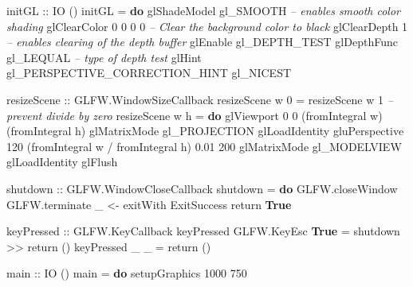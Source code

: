 \documentclass[]{article}
\newenvironment{Shaded}{}{}
\newcommand{\KeywordTok}[1]{\textcolor[rgb]{0.00,0.44,0.13}{\textbf{{#1}}}}
\newcommand{\DataTypeTok}[1]{\textcolor[rgb]{0.56,0.13,0.00}{{#1}}}
\newcommand{\DecValTok}[1]{\textcolor[rgb]{0.25,0.63,0.44}{{#1}}}
\newcommand{\FloatTok}[1]{\textcolor[rgb]{0.25,0.63,0.44}{{#1}}}
\newcommand{\CommentTok}[1]{\textcolor[rgb]{0.38,0.63,0.69}{\textit{{#1}}}}
\newcommand{\OtherTok}[1]{\textcolor[rgb]{0.00,0.44,0.13}{{#1}}}
\newcommand{\FunctionTok}[1]{\textcolor[rgb]{0.02,0.16,0.49}{{#1}}}
\newcommand{\NormalTok}[1]{{#1}}
\begin{document}
\begin{Shaded}
\begin{Highlighting}[]
\OtherTok{initGL ::} \DataTypeTok{IO} \NormalTok{()}
\NormalTok{initGL }\FunctionTok{=} \KeywordTok{do}
  \NormalTok{glShadeModel gl_SMOOTH }\CommentTok{-- enables smooth color shading}
  \NormalTok{glClearColor }\DecValTok{0} \DecValTok{0} \DecValTok{0} \DecValTok{0} \CommentTok{-- Clear the background color to black}
  \NormalTok{glClearDepth }\DecValTok{1} \CommentTok{-- enables clearing of the depth buffer}
  \NormalTok{glEnable gl_DEPTH_TEST}
  \NormalTok{glDepthFunc gl_LEQUAL  }\CommentTok{-- type of depth test}
  \NormalTok{glHint gl_PERSPECTIVE_CORRECTION_HINT gl_NICEST}
\end{Highlighting}
\end{Shaded}
\begin{Shaded}
\begin{Highlighting}[]
\OtherTok{resizeScene ::} \DataTypeTok{GLFW.WindowSizeCallback}
\NormalTok{resizeScene w     }\DecValTok{0}      \FunctionTok{=} \NormalTok{resizeScene w }\DecValTok{1} \CommentTok{-- prevent divide by zero}
\NormalTok{resizeScene w h }\FunctionTok{=} \KeywordTok{do}
  \NormalTok{glViewport }\DecValTok{0} \DecValTok{0} \NormalTok{(}\FunctionTok{fromIntegral} \NormalTok{w) (}\FunctionTok{fromIntegral} \NormalTok{h)}
  \NormalTok{glMatrixMode gl_PROJECTION}
  \NormalTok{glLoadIdentity}
  \NormalTok{gluPerspective }\DecValTok{120} \NormalTok{(}\FunctionTok{fromIntegral} \NormalTok{w }\FunctionTok{/} \FunctionTok{fromIntegral} \NormalTok{h) }\FloatTok{0.01} \DecValTok{200}
  \NormalTok{glMatrixMode gl_MODELVIEW}
  \NormalTok{glLoadIdentity}
  \NormalTok{glFlush}
\end{Highlighting}
\end{Shaded}
\begin{Shaded}
\begin{Highlighting}[]
\OtherTok{shutdown ::} \DataTypeTok{GLFW.WindowCloseCallback}
\NormalTok{shutdown }\FunctionTok{=} \KeywordTok{do}
  \NormalTok{GLFW.closeWindow}
  \NormalTok{GLFW.terminate}
  \NormalTok{_ }\OtherTok{<-} \NormalTok{exitWith }\DataTypeTok{ExitSuccess}
  \FunctionTok{return} \KeywordTok{True}
\end{Highlighting}
\end{Shaded}
\begin{Shaded}
\begin{Highlighting}[]
\OtherTok{keyPressed                  ::} \DataTypeTok{GLFW.KeyCallback}
\NormalTok{keyPressed }\DataTypeTok{GLFW.KeyEsc} \KeywordTok{True}  \FunctionTok{=} \NormalTok{shutdown }\FunctionTok{>>} \FunctionTok{return} \NormalTok{()}
\NormalTok{keyPressed _           _     }\FunctionTok{=} \FunctionTok{return} \NormalTok{()}
\end{Highlighting}
\end{Shaded}
\begin{Shaded}
\begin{Highlighting}[]
\OtherTok{main ::} \DataTypeTok{IO} \NormalTok{()}
\NormalTok{main }\FunctionTok{=} \KeywordTok{do}
  \NormalTok{setupGraphics }\DecValTok{1000} \DecValTok{750}
\end{Highlighting}
\end{Shaded}
\end{document}
